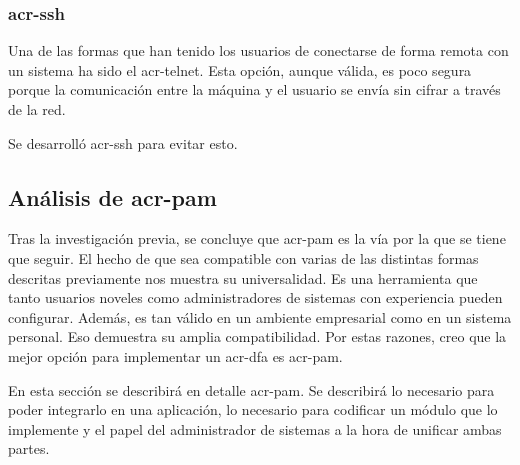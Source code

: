 \documentclass[twoside, titlepage, 12pt, a4paper]{article}
\begin{document}
\subsubsection{\gls{acr-ssh}}
Una de las formas que han tenido los usuarios de conectarse de forma remota con un sistema ha sido el \gls{acr-telnet}. Esta opción, aunque válida, es poco segura porque la comunicación entre la máquina y el usuario se envía sin cifrar a través de la red.\par Se desarrolló \gls{acr-ssh} para evitar esto.
\subsection{Análisis de \gls{acr-pam}}
Tras la investigación previa, se concluye que \gls{acr-pam} es la vía por la que se tiene que seguir. El hecho de que sea compatible con varias de las distintas formas descritas previamente nos muestra su universalidad. Es una herramienta que tanto usuarios noveles como administradores de sistemas con experiencia pueden configurar. Además, es tan válido en un ambiente empresarial como en un sistema personal. Eso demuestra su amplia compatibilidad. Por estas razones, creo que la mejor opción para implementar un \gls{acr-dfa} es \gls{acr-pam}.\par
En esta sección se describirá en detalle \gls{acr-pam}. Se describirá lo necesario para poder integrarlo en una aplicación, lo necesario para codificar un módulo que lo implemente y el papel del administrador de sistemas a la hora de unificar ambas partes.
\end{document}
